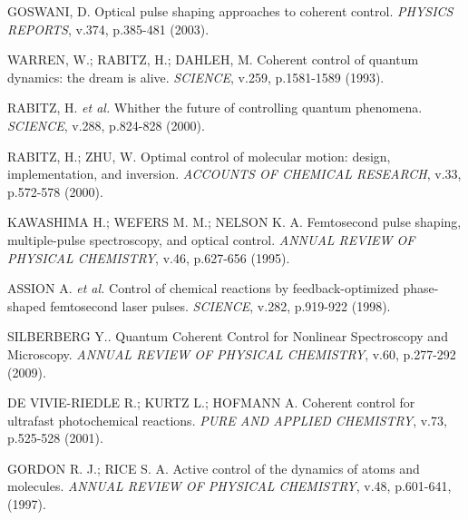 \begin{thebibliography}{99}



 GOSWANI, D. Optical pulse shaping approaches to coherent control. {\it PHYSICS REPORTS}, v.374, p.385-481 (2003).

 WARREN, W.; RABITZ, H.; DAHLEH, M. Coherent control of quantum dynamics: the dream is alive. {\it SCIENCE}, v.259, p.1581-1589 (1993).

 RABITZ, H. {\it et al.} Whither the future of controlling quantum phenomena. {\it SCIENCE}, v.288, p.824-828 (2000).

  RABITZ, H.; ZHU, W. Optimal control of molecular motion: design, implementation, and inversion. {\it ACCOUNTS OF CHEMICAL RESEARCH}, v.33, p.572-578 (2000).

 KAWASHIMA H.; WEFERS M. M.; NELSON K. A. Femtosecond pulse shaping, multiple-pulse spectroscopy, and optical control. {\it ANNUAL REVIEW OF PHYSICAL CHEMISTRY}, v.46, p.627-656 (1995).

 ASSION A. {\it et al.} Control of chemical reactions by feedback-optimized phase-shaped femtosecond laser pulses. {\it SCIENCE}, v.282, p.919-922 (1998).

 SILBERBERG Y.. Quantum Coherent Control for Nonlinear Spectroscopy and Microscopy. {\it ANNUAL REVIEW OF PHYSICAL CHEMISTRY}, v.60, p.277-292 (2009).

 DE VIVIE-RIEDLE R.; KURTZ L.; HOFMANN A. Coherent control for ultrafast photochemical reactions. {\it PURE AND APPLIED CHEMISTRY}, v.73, p.525-528 (2001).

 GORDON R. J.; RICE S. A. Active control of the dynamics of atoms and molecules. {\it ANNUAL REVIEW OF PHYSICAL CHEMISTRY}, v.48, p.601-641, (1997).



\end{thebibliography}





